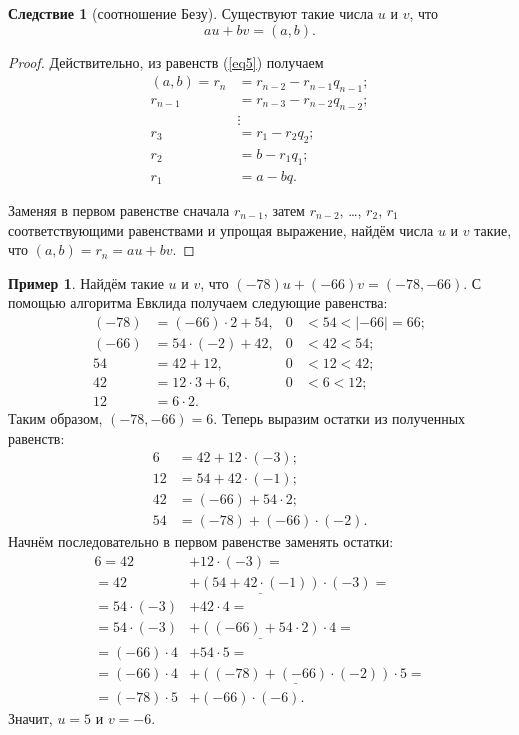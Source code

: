 \documentclass[14pt, a4paper]{extarticle}
\theoremstyle{definition}
\newtheorem{example}{Пример}
\newtheorem{corollary}{Следствие}[theorem]
\begin{document}
	\begin{corollary}[соотношение Безу]
	\label{bezu}
		Существуют такие числа $u$ и $v$, что $$\boxed{au+bv=(a,b).}$$
	\end{corollary}
	\begin{proof}
		Действительно, из равенств (\ref{eq5}) получаем
		\begin{align*}
			(a,b)=r_n&=r_{n-2}-r_{n-1}q_{n-1};\\
			r_{n-1}&=r_{n-3}-r_{n-2}q_{n-2};\\
			&\vdots\\
			r_3&=r_1-r_2q_2;\\
			r_2&=b-r_1q_1;\\
			r_1&=a-bq.
		\end{align*}
		
		Заменяя в первом равенстве сначала $r_{n-1}$, затем $r_{n-2}$, \dots, $r_2$, $r_1$ соответствующими равенствами и упрощая выражение, найдём числа $u$ и $v$ такие, что $(a,b)=r_n=au+bv$.
	\end{proof}

	\begin{example}
		Найдём такие $u$ и $v$, что $(-78)u+(-66)v=(-78,-66)$. С помощью алгоритма Евклида получаем следующие равенства:
		\begin{align*}
				(-78)&=(-66)\cdot2+54,&0&<54<|-66|=66;\\
				(-66)&=54\cdot(-2)+42,&0&<42<54;\\
				54&=42+12,&0&<12<42;\\
				42&=12\cdot3+6,&0&<6<12;\\
				12&=6\cdot2.
		\end{align*}
		Таким образом, $(-78,-66)=6$. Теперь выразим остатки из полученных равенств:
		\begin{align*}
			6&=42+12\cdot(-3);\\
			12&=54+42\cdot(-1);\\
			42&=(-66)+54\cdot2;\\
			54&=(-78)+(-66)\cdot(-2).
		\end{align*}
		Начнём последовательно в первом равенстве заменять остатки:
		\begin{align*}
			6=42&+\boxed{12}\cdot(-3)=\\
			=42&+\underline{(54+42\cdot(-1))}\cdot(-3)=\\
			=54\cdot(-3)&+\boxed{42}\cdot4=\\
			=54\cdot(-3)&+\underline{((-66)+54\cdot2)}\cdot4=\\
			=(-66)\cdot4&+\boxed{54}\cdot5=\\
			=(-66)\cdot4&+\underline{((-78)+(-66)\cdot(-2))}\cdot5=\\
			=\boxed{(-78)}\cdot5&+\boxed{(-66)}\cdot(-6).
		\end{align*}
		Значит, $u=5$ и $v=-6$.
	\end{example}
\end{document}
